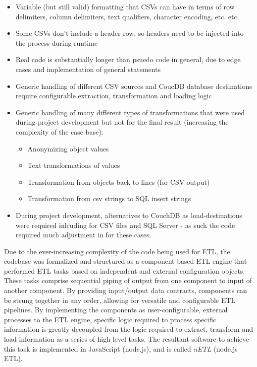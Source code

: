 \begin{itemize}
    \item Variable (but still valid) formatting that CSVs can have in terms of row delimiters, column delimiters, text qualifiers, character encoding, etc. etc.
    \item Some CSVs don't include a header row, so headers need to be injected into the process during runtime
    \item Real code is substantially longer than psuedo code in general, due to edge cases and implementation of general statements
    \item Generic handling of different CSV sources and CoucDB database destinations require configurable extraction, transformation and loading logic
    \item Generic handling of many different types of transformations that were used during project development but not for the final result (increasing the complexity of the case base):
          \begin{itemize}
              \item Anonymizing object values
              \item Text transformations of values
              \item Transformation from objects back to lines (for CSV output)
              \item Transformation from csv strings to SQL insert strings
          \end{itemize}
    \item During project development, alternatives to CouchDB as load-destinations were required inlcuding for CSV files and SQL Server - as such the code required much adjustment in for these cases.
\end{itemize}

Due to the ever-increasing complexity of the code being used for ETL, the codebase was formalized and structured as a component-based ETL engine that performed ETL tasks based on independent and external configuration objects. These tasks comprise sequential piping of output from one component to input of another component. By providing input/output data contracts, components can be strung together in any order, allowing for versatile and configurable ETL pipelines. By implementing the components as user-configurable, external processes to the ETL engine, specific logic required to process specific information is greatly decoupled from the logic required to extract, transform and load information as a series of high level tasks. The resultant software to achieve this task is implemented in JavaScript (node.js), and is called \textit{nETL} (node.js ETL).

